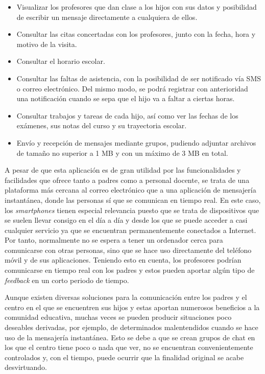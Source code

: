 \begin{itemize}
	\item Visualizar los profesores que dan clase a los hijos con sus datos y posibilidad de escribir un mensaje directamente a cualquiera de ellos.
	\item Consultar las citas concertadas con los profesores, junto con la fecha, hora y motivo de la visita.
	\item Consultar el horario escolar.
	\item Consultar las faltas de asistencia, con la posibilidad de ser notificado vía \acf{SMS} o correo electrónico. Del mismo modo, se podrá registrar con anterioridad una notificación cuando se sepa que el hijo va a faltar a ciertas horas.
	\item Consultar trabajos y tareas de cada hijo, así como ver las fechas de los exámenes, sus notas del curso y su trayectoria escolar.
	\item Envío y recepción de mensajes mediante grupos, pudiendo adjuntar archivos de tamaño no superior a 1 \acf{MB} y con un máximo de 3 \acs{MB} en total.
\end{itemize}

A pesar de que esta aplicación es de gran utilidad por las funcionalidades y facilidades que ofrece tanto a padres como a personal docente, se trata de una plataforma más cercana al correo electrónico que a una aplicación de mensajería instantánea, donde las personas sí que se comunican en tiempo real. En este caso, los \textit{smartphones} tienen especial relevancia puesto que se trata de dispositivos que se suelen llevar consigo en el día a día y desde los que se puede acceder a casi cualquier servicio ya que se encuentran permanentemente conectados a Internet. Por tanto, normalmente no se espera a tener un ordenador cerca para comunicarse con otras personas, sino que se hace uso directamente del teléfono móvil y de sus aplicaciones. Teniendo esto en cuenta, los profesores podrían comunicarse en tiempo real con los padres y estos pueden aportar algún tipo de \textit{feedback} en un corto periodo de tiempo.

Aunque existen diversas soluciones para la comunicación entre los padres y el centro en el que se encuentren sus hijos y estas aportan numerosos beneficios a la comunidad educativa, muchas veces se pueden producir situaciones poco deseables derivadas, por ejemplo, de determinados malentendidos cuando se hace uso de la mensajería instantánea. Esto se debe a que se crean grupos de chat en los que el centro tiene poco o nada que ver, no se encuentran convenientemente controlados y, con el tiempo, puede ocurrir que la finalidad original se acabe desvirtuando.

